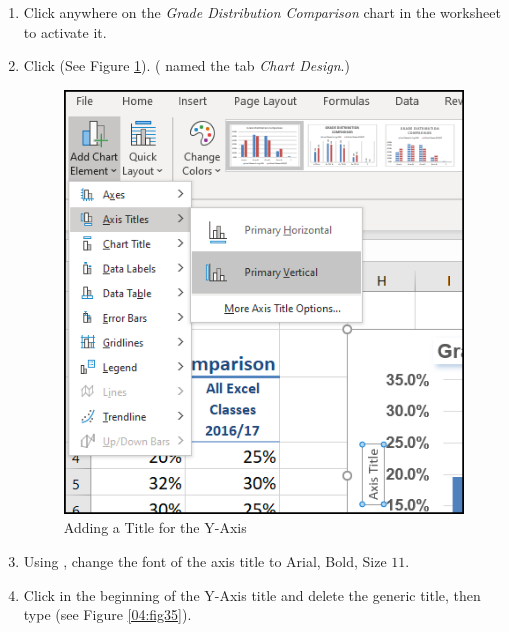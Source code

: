 \begin{enumbox}
	\begin{enumerate}
		\item Click anywhere on the \textit{Grade Distribution Comparison} chart in the  worksheet to activate it.
		\item Click  (See Figure \ref{04:fig34}). ( named the tab \textit{Chart Design}.)
	
		\begin{figure}[H]
			\centering
			\includegraphics[width=\maxwidth{.95\linewidth}]{gfx/ch04_fig34}
			\caption{Adding a Title for the Y-Axis}
			\label{04:fig34}
		\end{figure}
	
		\item Using , change the font of the axis title to Arial, Bold, Size $ 11 $.
		\item Click in the beginning of the Y-Axis title and delete the generic title, then type  (see Figure \ref{04:fig35}).
	\end{enumerate}
\end{enumbox}
	
